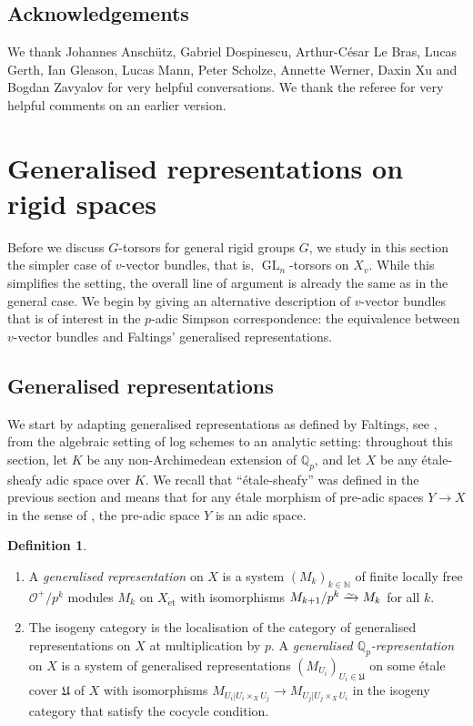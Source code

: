 \documentclass[11pt]{amsart}
\numberwithin{equation}{section}
\theoremstyle{definition}
\newtheorem{Definition}[thm]{Definition}
\theoremstyle{remark}
\newcommand*{\lowsim}{\vbox to 0pt{\vss\hbox{$\scriptstyle\sim$}\vskip-2pt}}
\newcommand*{\isomarrow}{\xrightarrow{\lowsim}}
\newcommand{\N}{\mathbb{N}}
\renewcommand{\O}{\mathcal{O}}
\newcommand{\Q}{\mathbb{Q}}
\newcommand{\GL}{\operatorname{GL}}
\newcommand{\et}{{\operatorname{\acute{e}t}}}
\begin{document}
\subsection*{Acknowledgements}
We thank Johannes Ansch\"utz, Gabriel Dospinescu, Arthur-C\'esar Le Bras, Lucas Gerth, Ian Gleason, Lucas Mann, Peter Scholze, Annette Werner, Daxin Xu and Bogdan Zavyalov for very helpful conversations. We thank the referee for very helpful comments on an earlier version.
  
\section{Generalised representations on rigid spaces}\label{s:generalised-representations}

Before we discuss $G$-torsors for general rigid groups $G$, we study in this section the simpler case of \mbox{$v$-vector} bundles, that is, $\GL_n$-torsors on $X_v$. While this simplifies the setting, the overall line of argument is already the same as in the general case.
We begin by giving an alternative description of $v$-vector bundles that is of interest in the $p$-adic Simpson correspondence: the equivalence between $v$-vector bundles and Faltings' generalised representations.

\subsection{Generalised representations}

We start by adapting generalised representations as defined by Faltings, see \cite[Section~2 and Theo\-rem~3]{Faltings_SimpsonI}, from the algebraic setting of log schemes to an analytic setting: throughout this section, let $K$ be any non-Archimedean extension of $\Q_p$, and let $X$ be any \'etale-sheafy adic space over $K$. We recall that ``\'etale-sheafy'' was defined in the previous section and means that for any \'etale morphism of pre-adic spaces $Y\to X$ in the sense of \cite[Definition 8.2.16]{KedlayaLiu-rel-p-p-adic-Hodge-I}, the pre-adic space $Y$ is an adic space.

\begin{Definition}\leavevmode
	\begin{enumerate}
		\item  A \emph{generalised representation} on $X$ is a system $(M_k)_{k\in \N}$ of finite locally free $\O^+/p^k$ modules $M_k$ on $X_{\et}$ with isomorphisms $M_{k+1}/p^k\isomarrow M_k$ for all $k$. 
		
		\item The isogeny category is the localisation of the category of generalised representations on $X$ at multiplication by $p$.
		A \emph{generalised $\Q_p$-representation} on $X$ is a system of generalised representations $(M_{U_i})_{U_i\in \mathfrak U}$ on some \'etale cover $\mathfrak U$ of $X$ with isomorphisms $M_{U_i|U_i\times_X U_j}\to M_{U_j|U_j\times_X U_i}$ in the isogeny category that satisfy the cocycle condition.
	\end{enumerate}
\end{Definition}
\end{document}
